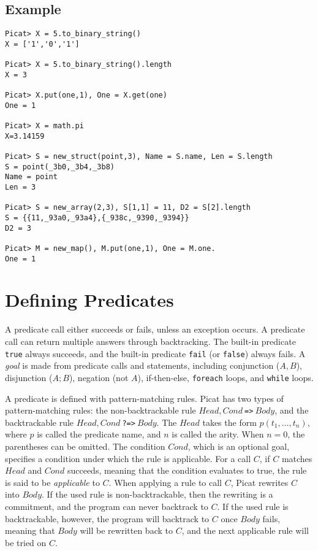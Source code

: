 \subsection*{Example}
\begin{verbatim}
Picat> X = 5.to_binary_string()
X = ['1','0','1']

Picat> X = 5.to_binary_string().length
X = 3

Picat> X.put(one,1), One = X.get(one)
One = 1

Picat> X = math.pi
X=3.14159

Picat> S = new_struct(point,3), Name = S.name, Len = S.length
S = point(_3b0,_3b4,_3b8)
Name = point
Len = 3

Picat> S = new_array(2,3), S[1,1] = 11, D2 = S[2].length
S = {{11,_93a0,_93a4},{_938c,_9390,_9394}}
D2 = 3

Picat> M = new_map(), M.put(one,1), One = M.one.
One = 1
\end{verbatim}

\section{Defining Predicates}
A predicate call either succeeds or fails, unless an exception occurs. A predicate call can return multiple answers through backtracking. The built-in predicate \texttt{true} always succeeds, and the built-in predicate \texttt{fail} (or \texttt{false}) always fails. A \emph{goal} is made from predicate calls and statements, including conjunction ($A,B$), disjunction ($A;B$), negation (not $A$), if-then-else, \texttt{foreach} loops, and \texttt{while} loops.

A predicate is defined with pattern-matching rules. Picat has two types of pattern-matching rules: the non-backtrackable rule $Head, Cond\ $\verb+=>+$\ Body$, and the backtrackable rule $Head, Cond\ $\verb+?=>+$\ Body$. The $Head$ takes the form $p(t_1,\ldots,t_n)$, where $p$ is called the predicate name, and $n$ is called the arity. When $n=0$, the parentheses can be omitted. The condition $Cond$, which is an optional goal, specifies a condition under which the rule is applicable. For a call $C$, if $C$ matches $Head$ and $Cond$ succeeds, meaning that the condition evaluates to true, the rule is said to be \emph{applicable} to $C$. When applying a rule to call $C$, Picat rewrites $C$ into $Body$. If the used rule is non-backtrackable, then the rewriting is a commitment, and the program can never backtrack to $C$. If the used rule is backtrackable, however, the program will backtrack to $C$ once $Body$ fails, meaning that $Body$ will be rewritten back to $C$, and the next applicable rule will be tried on $C$. 

